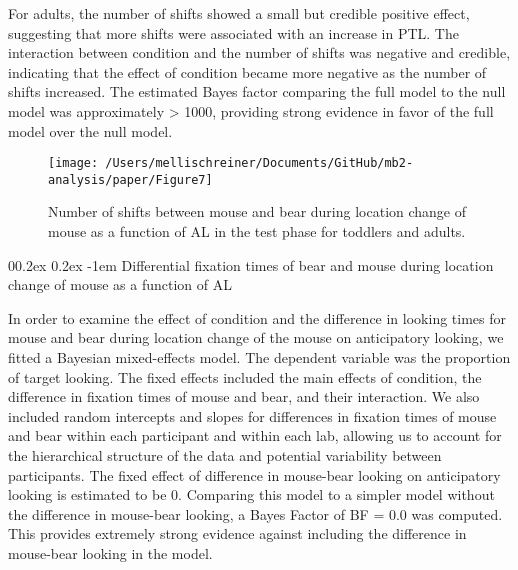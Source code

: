 \documentclass[
  english,
  man,floatsintext]{apa6}
\makeatletter
\let\oldparagraph\paragraph
\renewcommand{\paragraph}[1]{\oldparagraph{#1}\mbox{}}
\renewcommand{\paragraph}{\@startsection{paragraph}{4}{\parindent}%
  {0\baselineskip \@plus 0.2ex \@minus 0.2ex}%
  {-1em}%
  {\normalfont\normalsize\bfseries\itshape\typesectitle}}
\makeatother
\begin{document}
For adults, the number of shifts showed a small but credible positive effect, suggesting that more shifts were associated with an increase in PTL. The interaction between condition and the number of shifts was negative and credible, indicating that the effect of condition became more negative as the number of shifts increased. The estimated Bayes factor comparing the full model to the null model was approximately \textgreater{} 1000, providing strong evidence in favor of the full model over the null model.

\begin{figure}

{\centering \texttt{[image: /Users/mellischreiner/Documents/GitHub/mb2-analysis/paper/Figure7]} 

}

\caption{Number of shifts between mouse and bear during location change of mouse as a function of AL in the test phase for toddlers and adults.}\label{fig:fig9}
\end{figure}

\hypertarget{differential-fixation-times-of-bear-and-mouse-during-location-change-of-mouse-as-a-function-of-al}{%
\paragraph{Differential fixation times of bear and mouse during location change of mouse as a function of AL}\label{differential-fixation-times-of-bear-and-mouse-during-location-change-of-mouse-as-a-function-of-al}}

In order to examine the effect of condition and the difference in looking times for mouse and bear during location change of the mouse on anticipatory looking, we fitted a Bayesian mixed-effects model. The dependent variable was the proportion of target looking. The fixed effects included the main effects of condition, the difference in fixation times of mouse and bear, and their interaction. We also included random intercepts and slopes for differences in fixation times of mouse and bear within each participant and within each lab, allowing us to account for the hierarchical structure of the data and potential variability between participants. The fixed effect of difference in mouse-bear looking on anticipatory looking is estimated to be 0. Comparing this model to a simpler model without the difference in mouse-bear looking, a Bayes Factor of BF = 0.0 was computed. This provides extremely strong evidence against including the difference in mouse-bear looking in the model.
\end{document}
